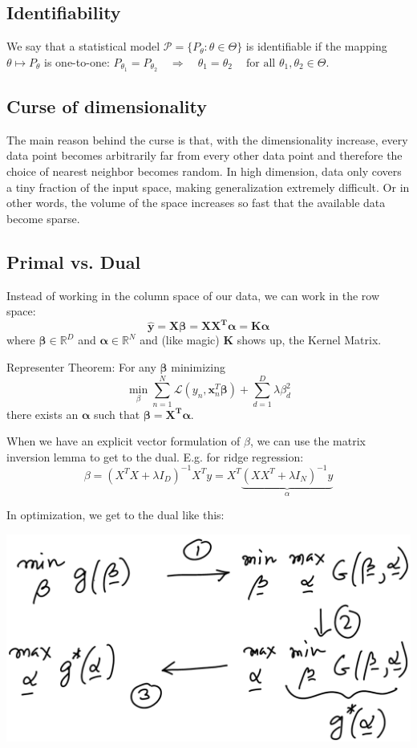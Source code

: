 \documentclass[10pt,a4paper,landscape]{article}
\providecommand{\bf}[1]{\ensuremath{\mathbf{#1}}}
\begin{document}
\begin{multicols*}{4}
\subsection{Identifiability}
We say that a statistical model $\mathcal{P} = \{P_\theta: \theta \in \Theta\}$ is identifiable if the mapping $\theta \mapsto P_\theta$ is one-to-one:
$P_{\theta_1}=P_{\theta_2} \quad\Rightarrow\quad \theta_1=\theta_2 \quad\ \text{for all } \theta_1,\theta_2\in\Theta.$


\subsection{Curse of dimensionality}
The main reason behind the curse is that, with the dimensionality increase, every data point becomes arbitrarily far
from every other data point and therefore the choice of nearest neighbor becomes random.
In high dimension, data only covers a tiny fraction of the input space, making generalization extremely difficult.
Or in other words, the volume of the space increases so fast that the available data become sparse.

\subsection{Primal vs. Dual}
Instead of working in the column space of our data, we can work in the row space:
$$\bf{\hat{y} = X \beta = X X^T \alpha = K \alpha}$$
where $\bf{\beta} \in \mathbb{R}^D$ and $\bf{\alpha} \in \mathbb{R}^N$
and (like magic) $\bf{K}$ shows up, the Kernel Matrix.

Representer Theorem: For any $\bf{\beta}$ minimizing
$$\min_\beta \sum_{n=1}^N \mathcal{L}(y_n, \bf{x}_n^T \bf{\beta}) + \sum_{d=1}^D \lambda \beta_d^2$$
there exists an $\bf{\alpha}$ such that $\bf{\beta = X^T \alpha}$.

When we have an explicit vector formulation of $\beta$, we can use the matrix inversion lemma to get to the dual. E.g. for ridge regression:
$$\beta = (X^T X  + \lambda I_D)^{-1} X^T y = X^T \underbrace{(X X^T + \lambda I_N)^{-1} y}_{\alpha}$$

In optimization, we get to the dual like this:
\begin{colfig}
  \centering
  \includegraphics[width=\linewidth]{images/prim-dual.png}
\end{colfig}


\end{multicols*}
\end{document}
